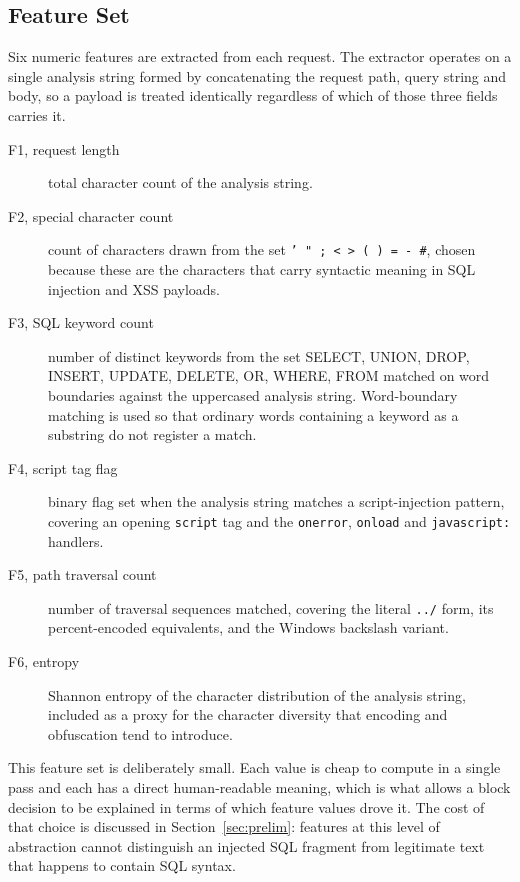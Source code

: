\documentclass[runningheads]{llncs}
\begin{document}
\subsection{Feature Set}
\label{sec:features}

Six numeric features are extracted from each request. The extractor
operates on a single analysis string formed by concatenating the
request path, query string and body, so a payload is treated
identically regardless of which of those three fields carries it.

\begin{description}
  \item[F1, request length] total character count of the analysis
    string.
  \item[F2, special character count] count of characters drawn from the
    set \texttt{' " ; < > ( ) = - \#}, chosen because these are the
    characters that carry syntactic meaning in SQL injection and XSS
    payloads.
  \item[F3, SQL keyword count] number of distinct keywords from the set
    SELECT, UNION, DROP, INSERT, UPDATE, DELETE, OR, WHERE, FROM
    matched on word boundaries against the uppercased analysis string.
    Word-boundary matching is used so that ordinary words containing a
    keyword as a substring do not register a match.
  \item[F4, script tag flag] binary flag set when the analysis string
    matches a script-injection pattern, covering an opening
    \texttt{script} tag and the \texttt{onerror}, \texttt{onload} and
    \texttt{javascript:} handlers.
  \item[F5, path traversal count] number of traversal sequences
    matched, covering the literal \texttt{../} form, its
    percent-encoded equivalents, and the Windows backslash variant.
  \item[F6, entropy] Shannon entropy of the character distribution of
    the analysis string, included as a proxy for the character
    diversity that encoding and obfuscation tend to introduce.
\end{description}

This feature set is deliberately small. Each value is cheap to compute
in a single pass and each has a direct human-readable meaning, which is
what allows a block decision to be explained in terms of which feature
values drove it. The cost of that choice is discussed in
Section~\ref{sec:prelim}: features at this level of abstraction cannot
distinguish an injected SQL fragment from legitimate text that happens
to contain SQL syntax.
\end{document}
